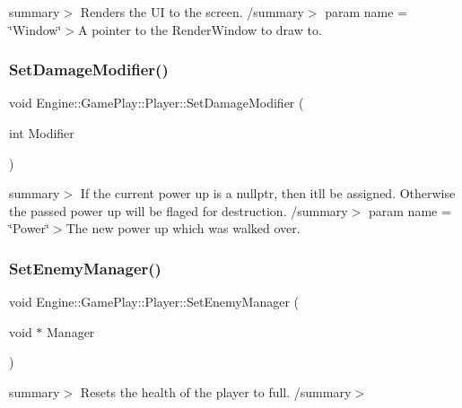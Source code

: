 summary$>$ Renders the UI to the screen. /summary$>$ param name = \char`\"{}\+Window\char`\"{}$>$A pointer to the Render\+Window to draw to.\mbox{\label{class_engine_1_1_game_play_1_1_player_a04dccb49dde0606ba440b07944abdc65}} 
\subsubsection{\texorpdfstring{Set\+Damage\+Modifier()}{SetDamageModifier()}}
{\footnotesize\ttfamily void Engine\+::\+Game\+Play\+::\+Player\+::\+Set\+Damage\+Modifier (\begin{DoxyParamCaption}\item[{int}]{Modifier }\end{DoxyParamCaption})}

summary$>$ If the current power up is a nullptr, then it\textquotesingle{}ll be assigned. Otherwise the passed power up will be flaged for destruction. /summary$>$ param name = \char`\"{}\+Power\char`\"{}$>$The new power up which was walked over.\mbox{\label{class_engine_1_1_game_play_1_1_player_adedc5552f70e5495ca1391b6f6143bec}} 
\subsubsection{\texorpdfstring{Set\+Enemy\+Manager()}{SetEnemyManager()}}
{\footnotesize\ttfamily void Engine\+::\+Game\+Play\+::\+Player\+::\+Set\+Enemy\+Manager (\begin{DoxyParamCaption}\item[{void $\ast$}]{Manager }\end{DoxyParamCaption})}

summary$>$ Resets the health of the player to full. /summary$>$ \mbox{\label{class_engine_1_1_game_play_1_1_player_a426ebc69b0607902e73563655ad66693}} 
